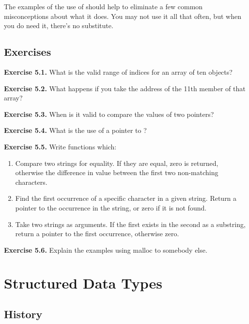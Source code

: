   The examples of the use of \sizeof{} should help to eliminate
   a few common misconceptions about what it does. You may not use it all
   that often, but when you do need it, there's no substitute.


 
        \section{Exercises}
        

  \textbf{Exercise 5.1.} What is the valid range of indices for an array of ten
   objects?


  \textbf{Exercise 5.2.} What happens if you take the address of the 11th member
   of that array?


  \textbf{Exercise 5.3.} When is it valid to compare the values of two
   pointers?


  \textbf{Exercise 5.4.} What is the use of a pointer to
   \void{}?


  \textbf{Exercise 5.5.} Write functions which:

\begin{enumerate}
    \item Compare two strings for equality. If they are equal, zero is returned,
     otherwise the difference in value between the first two non-matching
     characters.

    \item Find the first occurrence of a specific character in a given string.
     Return a pointer to the occurrence in the string, or zero if it is not
     found.

    \item Take two strings as arguments. If the first exists in the second as a
     substring, return a pointer to the first occurrence, otherwise zero.
   \end{enumerate}

  \textbf{Exercise 5.6.} Explain the examples using malloc to somebody
   else.


 \chapter{Structured Data Types}


        \section{History}
        

